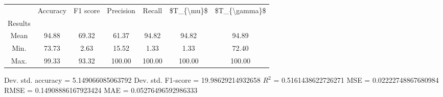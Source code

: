 \begin{tabular}{|c|c|c|c|c|c|c|}
\toprule
{} &  Accuracy &  F1 score &  Precision &  Recall &  \$T\_\{\textbackslash mu\}\$ &  \$T\_\{\textbackslash gamma\}\$ \\
Results &           &           &            &         &            &               \\
\hline
Mean    &     94.88 &     69.32 &      61.37 &   94.82 &      94.82 &         94.89 \\
Min.    &     73.73 &      2.63 &      15.52 &    1.33 &       1.33 &         72.40 \\
Max.    &     99.33 &     93.32 &     100.00 &  100.00 &     100.00 &        100.00 \\
\bottomrule
\end{tabular}

 Dev. std. accuracy = 5.149066085063792
 Dev. std. F1-score = 19.98629214932658
 $R^2$ = 0.5161438622726271
 MSE = 0.02222748867680984
 RMSE = 0.14908886167923424
 MAE = 0.05276496592986333